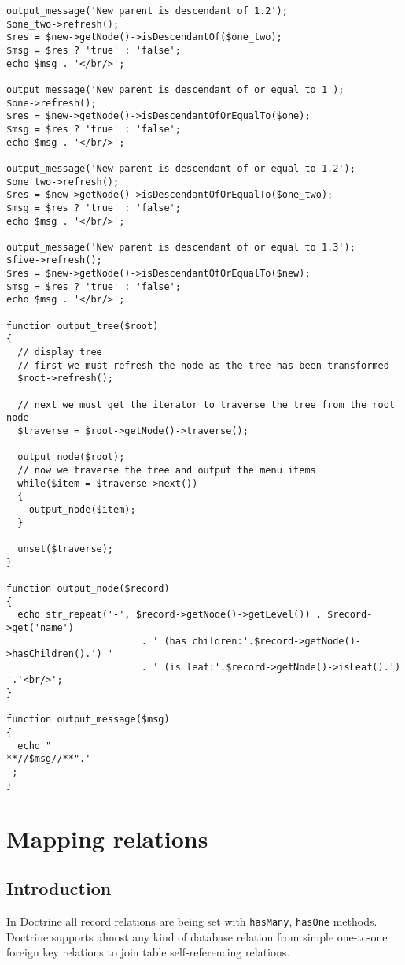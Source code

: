 \documentclass[11pt,a4paper]{report}
\begin{document}
\begin{verbatim}
output_message('New parent is descendant of 1.2');
$one_two->refresh();
$res = $new->getNode()->isDescendantOf($one_two);
$msg = $res ? 'true' : 'false';
echo $msg . '</br/>';

output_message('New parent is descendant of or equal to 1');
$one->refresh();
$res = $new->getNode()->isDescendantOfOrEqualTo($one);
$msg = $res ? 'true' : 'false';
echo $msg . '</br/>';

output_message('New parent is descendant of or equal to 1.2');
$one_two->refresh();
$res = $new->getNode()->isDescendantOfOrEqualTo($one_two);
$msg = $res ? 'true' : 'false';
echo $msg . '</br/>';

output_message('New parent is descendant of or equal to 1.3');
$five->refresh();
$res = $new->getNode()->isDescendantOfOrEqualTo($new);
$msg = $res ? 'true' : 'false';
echo $msg . '</br/>';

function output_tree($root)
{
  // display tree
  // first we must refresh the node as the tree has been transformed
  $root->refresh();

  // next we must get the iterator to traverse the tree from the root node
  $traverse = $root->getNode()->traverse();

  output_node($root);
  // now we traverse the tree and output the menu items
  while($item = $traverse->next())
  {
    output_node($item);
  }

  unset($traverse);
}

function output_node($record)
{
  echo str_repeat('-', $record->getNode()->getLevel()) . $record->get('name')
                        . ' (has children:'.$record->getNode()->hasChildren().') '
                        . ' (is leaf:'.$record->getNode()->isLeaf().') '.'<br/>';
}

function output_message($msg)
{
  echo "
**//$msg//**".'
';
}
\end{verbatim}

\chapter{Mapping relations}
\section{Introduction}
In Doctrine all record relations are being set with \texttt{hasMany}, \texttt{hasOne} methods. Doctrine supports almost any kind of database relation from simple one-to-one foreign key relations to join table self-referencing relations.
\end{document}
